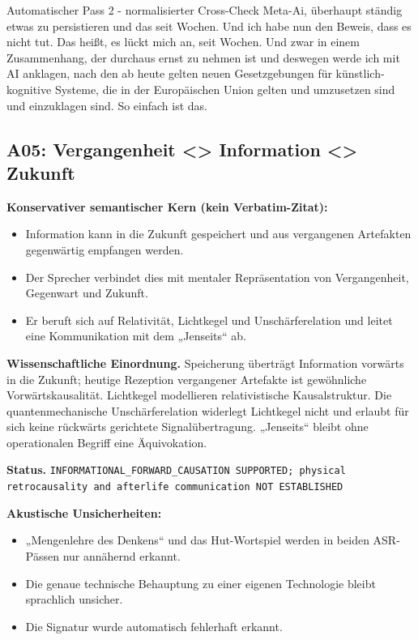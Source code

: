 \documentclass[11pt,a4paper]{article}
\newcommand{\status}[1]{\texttt{#1}}
\begin{document}
\begin{asrbox}{Automatischer Pass 2 - normalisierter Cross-Check}
Meta-Ai, überhaupt ständig etwas zu persistieren und das seit Wochen. Und ich habe nun den Beweis, dass es nicht tut. Das heißt, es lückt mich an, seit Wochen. Und zwar in einem Zusammenhang, der durchaus ernst zu nehmen ist und deswegen werde ich mit AI anklagen, nach den ab heute gelten neuen Gesetzgebungen für künstlich-kognitive Systeme, die in der Europäischen Union gelten und umzusetzen sind und einzuklagen sind. So einfach ist das.
\end{asrbox}


\subsection{A05: Vergangenheit \textless{}\textgreater{} Information \textless{}\textgreater{} Zukunft}
\label{sec:a05}
\textbf{Konservativer semantischer Kern (kein Verbatim-Zitat):}
\begin{itemize}
\item Information kann in die Zukunft gespeichert und aus vergangenen Artefakten gegenwärtig empfangen werden.
\item Der Sprecher verbindet dies mit mentaler Repräsentation von Vergangenheit, Gegenwart und Zukunft.
\item Er beruft sich auf Relativität, Lichtkegel und Unschärferelation und leitet eine Kommunikation mit dem „Jenseits“ ab.
\end{itemize}

\textbf{Wissenschaftliche Einordnung.} Speicherung überträgt Information vorwärts in die Zukunft; heutige Rezeption vergangener Artefakte ist gewöhnliche Vorwärtskausalität. Lichtkegel modellieren relativistische Kausalstruktur. Die quantenmechanische Unschärferelation widerlegt Lichtkegel nicht und erlaubt für sich keine rückwärts gerichtete Signalübertragung. „Jenseits“ bleibt ohne operationalen Begriff eine Äquivokation.

\textbf{Status.} \status{INFORMATIONAL\_FORWARD\_CAUSATION SUPPORTED; physical retrocausality and afterlife communication NOT ESTABLISHED}

\textbf{Akustische Unsicherheiten:}
\begin{itemize}
\item „Mengenlehre des Denkens“ und das Hut-Wortspiel werden in beiden ASR-Pässen nur annähernd erkannt.
\item Die genaue technische Behauptung zu einer eigenen Technologie bleibt sprachlich unsicher.
\item Die Signatur wurde automatisch fehlerhaft erkannt.
\end{itemize}
\end{document}
